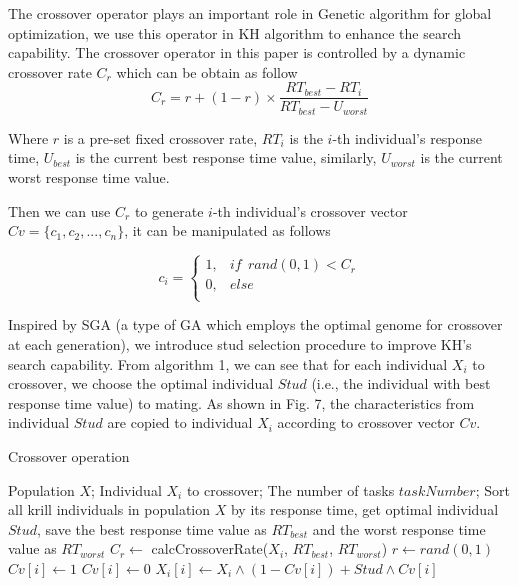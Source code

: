\documentclass[journal]{IEEEtran}
\begin{document}
The crossover operator plays an important role in Genetic algorithm for global optimization, we use this operator in KH algorithm to enhance the search capability. The crossover operator in this paper is controlled by a dynamic crossover rate $C_{r}$ which can be obtain as follow
\begin{equation}
C_{r} = r + (1-r) \times \frac{RT_{best}-RT_{i}}{RT_{best}-U_{worst}}
\end{equation}

Where $r$ is a pre-set fixed crossover rate, $RT_{i}$ is the $i$-th individual's response time, $U_{best}$ is the current best response time value, similarly, $U_{worst}$ is the current worst response time value.

Then we can use $C_{r}$ to generate $i$-th individual's crossover vector $Cv = \{c_{1},c_{2},...,c_{n}\}$, it can be manipulated as follows

\begin{equation}
c_{i}=
\begin{cases}
1,& if \ \ rand(0,1) < C_{r}\\
0,& else\\
\end{cases}
\end{equation}

Inspired by SGA \cite{khatib1998stud} (a type of GA which employs the optimal genome for crossover at each generation), we introduce stud selection procedure to improve KH's search capability.
From algorithm 1, we can see that for each individual $X_i$ to crossover, we choose the optimal individual $Stud$ (i.e., the individual with best response time value) to mating. As shown in Fig. 7, the characteristics from individual $Stud$ are copied to individual $X_i$ according to crossover vector $Cv$. 

\begin{algorithm}
\caption{Crossover operation}
\label{alg1}
\begin{algorithmic}[1]

\REQUIRE Population $X$; Individual $X_i$ to crossover; The number of tasks $taskNumber$; 
\STATE Sort all krill individuals in population $X$ by its response time, get optimal individual $Stud$, save the best response time value as $RT_{best}$ and the worst response time value as $RT_{worst}$
\STATE $C_{r} \leftarrow$ calcCrossoverRate($X_i$, $RT_{best}$, $RT_{worst}$)
\STATE $r \leftarrow rand(0,1)$
\STATE $Cv[i] \leftarrow 1$
\ELSE
\STATE $Cv[i] \leftarrow 0$
\ENDIF
\ENDFOR
{}
\STATE $X_i[i] \leftarrow X_i \wedge  (1-Cv[i]) + Stud \wedge Cv[i]$ 
\ENDFOR
\end{algorithmic}
\end{algorithm}
\end{document}
